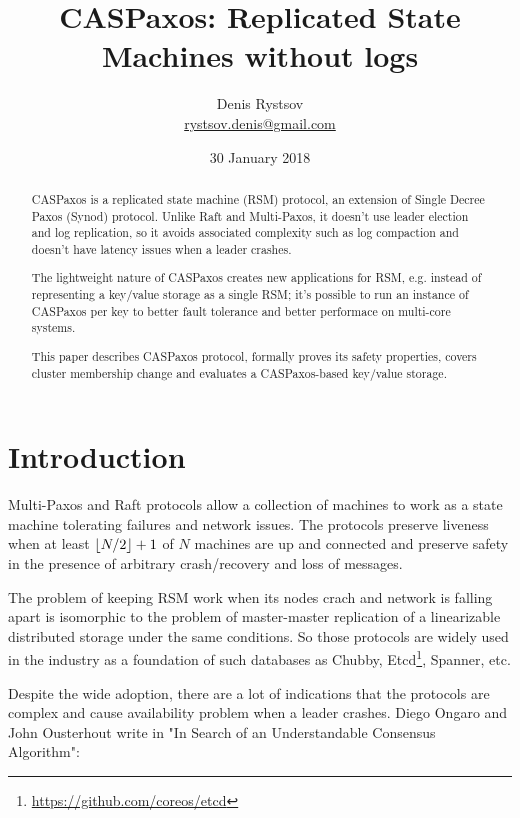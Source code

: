 \documentclass[12pt]{article}
\theoremstyle{definition}
\DeclarePairedDelimiter{\floor}{\lfloor}{\rfloor}
\begin{document}
\title{CASPaxos: Replicated State Machines without logs}
\date{30 January 2018}
\author{Denis Rystsov \\
\href{mailto:rystsov.denis@gmail.com}{rystsov.denis@gmail.com}}


\maketitle

\begin{abstract}
CASPaxos is a replicated state machine (RSM) protocol, an extension of Single Decree Paxos (Synod) protocol. Unlike Raft and Multi-Paxos, it doesn't use leader election and log replication, so it avoids associated complexity such as log compaction and doesn't have latency issues when a leader crashes.

The lightweight nature of CASPaxos creates new applications for RSM, e.g. instead of representing a key/value storage as a single RSM; it's possible to run an instance of CASPaxos per key to better fault tolerance and better performace on multi-core systems.

This paper describes CASPaxos protocol, formally proves its safety properties, covers cluster membership change and evaluates a CASPaxos-based key/value storage.
\end{abstract}

\section{Introduction}

Multi-Paxos\cite{lamport01} and Raft\cite{raft} protocols allow a collection of machines to work as a state machine tolerating failures and network issues. The protocols preserve liveness when at least $\floor{N/2} + 1$ of $N$ machines are up and connected and preserve safety in the presence of arbitrary crash/recovery and loss of messages.

The problem of keeping RSM work when its nodes crach and network is falling apart is isomorphic to the problem of master-master replication of a linearizable distributed storage under the same conditions. So those protocols are widely used in the industry as a foundation of such databases as Chubby\cite{chubby}, Etcd\footnote{\href{https://github.com/coreos/etcd}{https://github.com/coreos/etcd}}, Spanner\cite{spanner}, etc.

Despite the wide adoption, there are a lot of indications that the protocols are complex and cause availability problem when a leader crashes. Diego Ongaro and John Ousterhout write in "In Search of an Understandable Consensus Algorithm"\cite{raft}:
\end{document}
